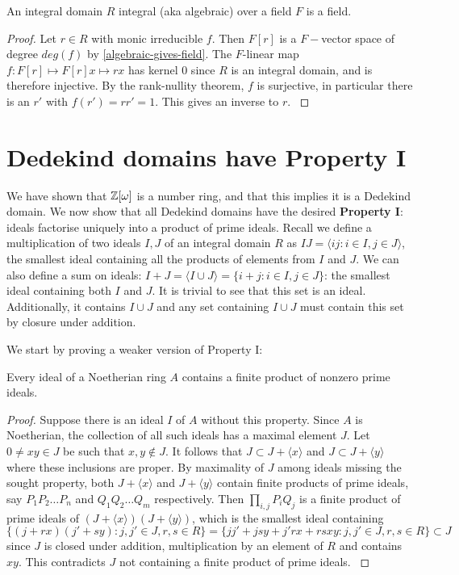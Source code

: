 \begin{lemma}
An integral domain $R$ integral (aka algebraic) over a field $F$ is a field.
\end{lemma}
\begin{proof}
Let $r\in R$ with monic irreducible $f$. Then $F[r]$ is a $F-$vector space of degree $deg(f)$ by \cref{algebraic-gives-field}. The $F$-linear map $f:F[r]\mapsto F[r] x\mapsto rx$ has kernel $0$ since $R$ is an integral domain, and is therefore injective. By the rank-nullity theorem, $f$ is surjective, in particular there is an $r'$ with $f(r')=rr'=1.$ This gives an inverse to $r$. \cite{Wright}
\end{proof}

\section{Dedekind domains have Property I}

We have shown that $\mathbb{Z}[\omega]$ is a number ring, and that this implies it is a Dedekind domain. We now show that all Dedekind domains have the desired \textbf{Property I}: ideals factorise uniquely into a product of prime ideals. Recall we define a multiplication of two ideals $I,J$ of an integral domain $R$ as $IJ=\langle ij :i\in I, j\in J \rangle$, the smallest ideal containing all the products of elements from $I$ and $J$. We can also define a sum on ideals: $I+J=\langle I\cup J\rangle=\{i+j:i\in I, j\in J\}$: the smallest ideal containing both $I$ and $J$. It is trivial to see that this set is an ideal. Additionally, it contains $I\cup J$ and any set containing $I\cup J$ must contain this set by closure under addition.

We start by proving a weaker version of Property I:
\begin{lemma}\label{noetherian-ideals-contain-finite-product-of-primes}
Every ideal of a Noetherian ring $A$ contains a finite product of nonzero prime ideals.
\end{lemma}
\begin{proof}
Suppose there is an ideal $I$ of $A$ without this property. Since $A$ is Noetherian, the collection of all such ideals has a maximal element $J.$ Let $0\neq xy\in J$ be such that $x,y\not \in J$. It follows that $J\subset J+\langle x \rangle$ and $J\subset J+ \langle y\rangle$ where these inclusions are proper. By maximality of $J$ among ideals missing the sought property, both $J+\langle x \rangle$ and $J+\langle y \rangle$ contain finite products of prime ideals, say $P_1P_2\dots P_n$ and $Q_1Q_2\dots Q_m$ respectively. Then $\prod_{i,j} P_iQ_j$ is a finite product of prime ideals of $(J+\langle x\rangle)(J+\langle y\rangle)$, which is the smallest ideal containing $$\{(j+rx)(j'+sy):j,j'\in J, r,s\in R\}=\{jj'+jsy+j'rx+rsxy:j,j'\in J, r,s\in R\}\subset J$$
since $J$ is closed under addition, multiplication by an element of $R$ and contains $xy$. This contradicts $J$ not containing a finite product of prime ideals.
\cite{Wright}
\end{proof}


